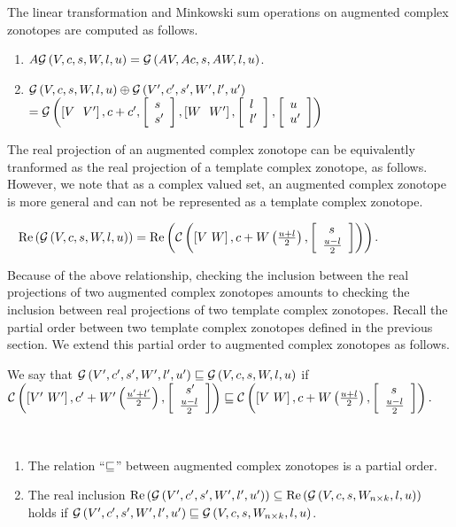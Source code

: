 %
The linear transformation and Minkowski sum operations on
augmented complex zonotopes are computed as follows.
%
\begin{lemma}
\begin{enumerate}
\item $A\mathcal{G}\left(V,c,s,W,l,u\right) = \mathcal{G}\left(AV,Ac,s,AW,l,u\right)$.
\item $\mathcal{G}\left(V,c,s,W,l,u\right)\oplus
  \mathcal{G}\left(V^\prime,c^\prime,s^\prime,W^\prime,l^\prime,u^\prime\right)$\\
$= \mathcal{G}\left(\left[V~~V^\prime\right],c+c^\prime,\left[\begin{array}{l}{s}\\{s^\prime} \end{array}\right],\left[W~~W^\prime\right],\left[\begin{array}{l}{l}\\{l^\prime} \end{array}\right],\left[\begin{array}{l}{u}\\{u^\prime} \end{array}\right]\right)$
\end{enumerate}
\end{lemma}
%
The real projection of an augmented complex zonotope can be
equivalently tranformed as the real projection of a template complex
zonotope, as follows.  However, we note that as a complex valued set,
an augmented complex zonotope is more general and can not be
represented as a template complex zonotope.
%
\begin{lemma}~\label{lem:conversion}
$\operatorname{\operatorname{Re}}\left(\mathcal{G}\left(V,c,s,W,l,u\right)\right) = \operatorname{\operatorname{Re}}\left(\mathcal{C}\left(\left[V~W\right],c+W\left(\frac{u+l}{2}\right),\left[\begin{array}{l}{\hspace{0.5em}s}\\{\frac{u-l}{2}} \end{array}\right]\right)\right)$.
\end{lemma}
%
Because of the above relationship, checking the inclusion between the
real projections of two augmented complex zonotopes amounts to checking the
inclusion between real projections of two template complex zonotopes.
%
Recall the partial order between two template complex zonotopes
defined in the previous section. We extend this partial order to
augmented complex zonotopes as follows.

\begin{definition}
We say that $\mathcal{G}\left(V^\prime,c^\prime,s^\prime,W^\prime,l^\prime,u^\prime\right)\sqsubseteq
\mathcal{G}\left(V,c,s,W,l,u\right)$ if\\ $\mathcal{C}\left(\left[V^\prime~W^\prime\right],c^\prime+W^\prime\left(\frac{u^\prime+l^\prime}{2}\right),\left[\begin{array}{l}{\hspace{0.5em}s^\prime}\\{\frac{u-l}{2}} \end{array}\right]\right)
\sqsubseteq
\mathcal{C}\left(\left[V~W\right],c+W\left(\frac{u+l}{2}\right),\left[\begin{array}{l}{\hspace{0.5em}s}\\{\frac{u-l}{2}} \end{array}\right]\right).$
\end{definition}

\begin{lemma}~\label{lem:gcz-gcz} 
\begin{enumerate}
\item The relation ``$\sqsubseteq$'' between
  augmented complex zonotopes is a partial order.  
\item The real inclusion
  $\operatorname{\operatorname{Re}}\left(\mathcal{G}\left(V^\prime,c^\prime,s^\prime,W^\prime,l^\prime,u^\prime\right)\right)\subseteq
  \operatorname{\operatorname{Re}}\left(\mathcal{G}\left(V,c,s,W_{n\times k},l,u\right)\right)$ holds if
  $\mathcal{G}\left(V^\prime,c^\prime,s^\prime,W^\prime,l^\prime,u^\prime\right)\sqsubseteq
  \mathcal{G}\left(V,c,s,W_{n\times k},l,u\right)$.
\end{enumerate}
\end{lemma}

